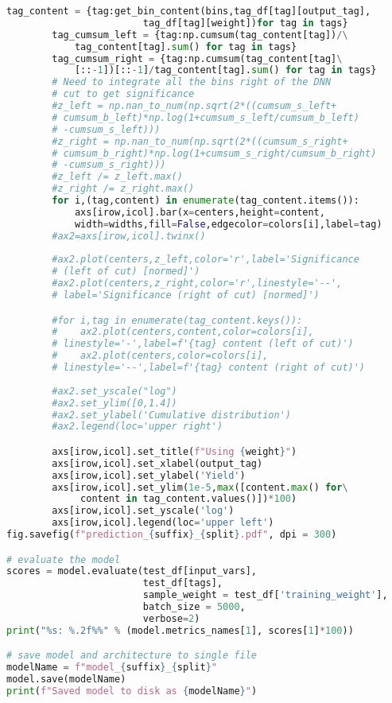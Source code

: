 \begin{lstlisting}[language=Python, caption=DNN setup for the \wwgg semi-leptonic final state, label={dnncode}]
        tag_content = {tag:get_bin_content(bins,tag_df[tag][output_tag],
                        tag_df[tag][weight])for tag in tags}
        tag_cumsum_left = {tag:np.cumsum(tag_content[tag])/\
            tag_content[tag].sum() for tag in tags}
        tag_cumsum_right = {tag:np.cumsum(tag_content[tag]\
            [::-1])[::-1]/tag_content[tag].sum() for tag in tags}
        # Need to integrate all the bins right of the DNN 
        # cut to get significance
        #z_left = np.nan_to_num(np.sqrt(2*((cumsum_s_left+
        # cumsum_b_left)*np.log(1+cumsum_s_left/cumsum_b_left)
        # -cumsum_s_left)))
        #z_right = np.nan_to_num(np.sqrt(2*((cumsum_s_right+
        # cumsum_b_right)*np.log(1+cumsum_s_right/cumsum_b_right)
        # -cumsum_s_right)))
        #z_left /= z_left.max()
        #z_right /= z_right.max()
        for i,(tag,content) in enumerate(tag_content.items()):
            axs[irow,icol].bar(x=centers,height=content,
            width=widths,fill=False,edgecolor=colors[i],label=tag)     
        #ax2=axs[irow,icol].twinx()   
        
        #ax2.plot(centers,z_left,color='r',label='Significance
        # (left of cut) [normed]')
        #ax2.plot(centers,z_right,color='r',linestyle='--',
        # label='Significance (right of cut) [normed]')

        #for i,tag in enumerate(tag_content.keys()):
        #    ax2.plot(centers,content,color=colors[i],
        # linestyle='-',label=f'{tag} content (left of cut)')
        #    ax2.plot(centers,color=colors[i],
        # linestyle='--',label=f'{tag} content (right of cut)')
        
        #ax2.set_yscale("log")
        #ax2.set_ylim([0,1.4])
        #ax2.set_ylabel('Cumulative distribution')
        #ax2.legend(loc='upper right')

        axs[irow,icol].set_title(f"Using {weight}")
        axs[irow,icol].set_xlabel(output_tag)
        axs[irow,icol].set_ylabel('Yield')
        axs[irow,icol].set_ylim(1e-5,max([content.max() for\
             content in tag_content.values()])*100)
        axs[irow,icol].set_yscale('log')
        axs[irow,icol].legend(loc='upper left')
fig.savefig(f"prediction_{suffix}_{split}.pdf", dpi = 300)

# evaluate the model
scores = model.evaluate(test_df[input_vars], 
                        test_df[tags], 
                        sample_weight = test_df['training_weight'], 
                        batch_size = 5000,
                        verbose=2)
print("%s: %.2f%%" % (model.metrics_names[1], scores[1]*100))

# save model and architecture to single file
modelName = f"model_{suffix}_{split}"
model.save(modelName)
print(f"Saved model to disk as {modelName}")
\end{lstlisting}